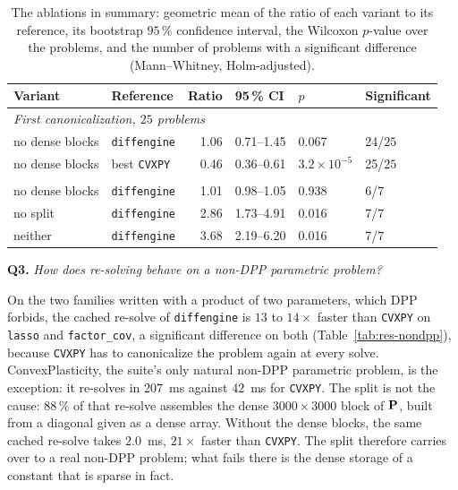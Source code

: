 \documentclass[letterpaper,12pt]{article}
\newcommand{\ac}[1]{#1}
\newcommand{\question}[2]{\FloatBarrier\par\bigskip\textbf{Q#1.} \emph{#2}\par}
\begin{document}
\begin{table}[htbp]
\centering
\caption{The ablations in summary: geometric mean of the ratio of each variant to its
reference, its bootstrap $95\,\%$ confidence interval, the Wilcoxon $p$-value over the problems,
and the number of problems with a significant difference (Mann--Whitney, Holm-adjusted).}
\label{tab:res-ablation}
{\small
\begin{tabular}{l l r l l l}
\toprule
Variant & Reference & Ratio & 95\,\% CI & $p$ & Significant \\
\midrule
\multicolumn{6}{l}{\textit{First canonicalization, $25$ problems}} \\
no dense blocks        & \texttt{diffengine}  & 1.06 & 0.71--1.45 & 0.067 & 24/$25$ \\
no dense blocks        & best \texttt{CVXPY}  & 0.46 & 0.36--0.61 & $3.2 \times 10^{-5}$ & 25/$25$ \\
\addlinespace
\multicolumn{6}{l}{\textit{Re-solve, $7$ \ac{DPP} problems}} \\
no dense blocks        & \texttt{diffengine}  & 1.01 & 0.98--1.05 & 0.938 & 6/$7$ \\
no split               & \texttt{diffengine}  & 2.86 & 1.73--4.91 & 0.016 & 7/$7$ \\
neither                & \texttt{diffengine}  & 3.68 & 2.19--6.20 & 0.016 & 7/$7$ \\
\bottomrule
\end{tabular}}
\end{table}


\question{3}{How does re-solving behave on a non-DPP parametric problem?}
On the two families written with a product of two parameters, which \ac{DPP} forbids, the cached
re-solve of \texttt{diffengine} is $13$ to $14\times$ faster than \texttt{CVXPY} on \texttt{lasso}
and \texttt{factor\_cov}, a significant difference on both (Table~\ref{tab:res-nondpp}), because
\texttt{CVXPY}
has to canonicalize the problem again at every solve.
ConvexPlasticity, the suite's only natural non-DPP parametric problem, is the exception: it
re-solves in $207$~ms against $42$~ms for \texttt{CVXPY}. The split is not the cause: $88\,\%$ of
that re-solve assembles the dense $3000 \times 3000$ block of $\mathbf{P}$, built from a diagonal
given as a dense array. Without the dense blocks, the same cached re-solve takes $2.0$~ms,
$21\times$ faster than \texttt{CVXPY}. The split therefore carries over to a real non-DPP
problem; what fails there is the dense storage of a constant that is sparse in fact.
\end{document}
